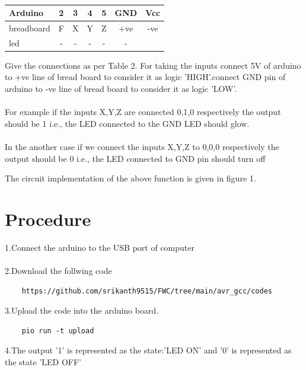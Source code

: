 \documentclass[10pt, a4paper]{article}
\begin{document}
    
    \begin{table}[htbp]
 \begin{center}
    \begin{tabular}{|l|c|c|c|c|c|c|} \hline 
  \textbf{Arduino}& \textbf{2} & \textbf{3}&\textbf{4}&\textbf{5} &\textbf{GND} &\textbf{Vcc}\\
   \hline
 breadboard& F & X & Y & Z & +ve & -ve\\ \hline
led & - & - & - & - & - \\ \hline
\end{tabular}   
\end{center}
\caption{\label{table:dummytable} }
\end{table}
Give the connections as per Table 2. For taking the inputs connect 5V of arduino to +ve line of bread board to consider it as logic 'HIGH'.connect GND pin of arduino to -ve line of bread board to consider it as logic 'LOW'.
\\
\\
For example if the inputs X,Y,Z are connected 0,1,0 respectively the output should be 1 i.e., the LED connected to the GND LED should glow.
\\
\\
In the another case if we connect the inputs X,Y,Z to 0,0,0 respectively the output should be 0 i.e., the LED connected to GND pin should turn off

The circuit implementation of the above function is given in figure 1.




  \section{Procedure}
  1.Connect the arduino to the USB port of computer
  \\
  \\2.Download the follwing code
  \\
  \begin{lstlisting}
    https://github.com/srikanth9515/FWC/tree/main/avr_gcc/codes
  \end{lstlisting}
  
  3.Upload the code into the arduino board.
  
  \begin{lstlisting}
    pio run -t upload
  \end{lstlisting}
  
  4.The output '1' is represented as the state:'LED ON' and '0' is represented as the state 'LED OFF'
   



    

    
 
\end{document}
